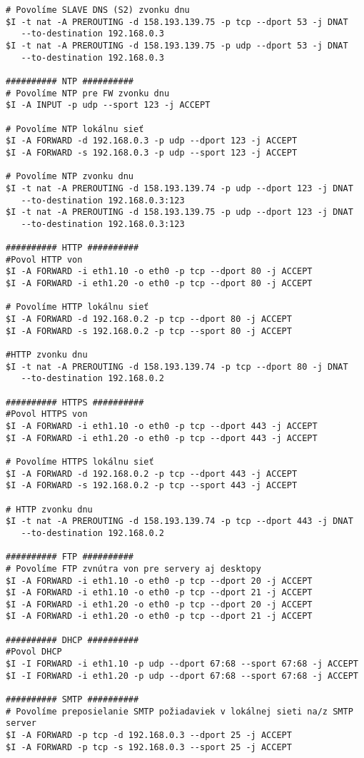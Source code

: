 {\begin{small}
\begin{verbatim}
# Povolíme SLAVE DNS (S2) zvonku dnu
$I -t nat -A PREROUTING -d 158.193.139.75 -p tcp --dport 53 -j DNAT
   --to-destination 192.168.0.3
$I -t nat -A PREROUTING -d 158.193.139.75 -p udp --dport 53 -j DNAT
   --to-destination 192.168.0.3

########## NTP ##########
# Povolíme NTP pre FW zvonku dnu
$I -A INPUT -p udp --sport 123 -j ACCEPT

# Povolíme NTP lokálnu sieť
$I -A FORWARD -d 192.168.0.3 -p udp --dport 123 -j ACCEPT
$I -A FORWARD -s 192.168.0.3 -p udp --sport 123 -j ACCEPT

# Povolíme NTP zvonku dnu
$I -t nat -A PREROUTING -d 158.193.139.74 -p udp --dport 123 -j DNAT
   --to-destination 192.168.0.3:123
$I -t nat -A PREROUTING -d 158.193.139.75 -p udp --dport 123 -j DNAT
   --to-destination 192.168.0.3:123

########## HTTP ##########
#Povol HTTP von
$I -A FORWARD -i eth1.10 -o eth0 -p tcp --dport 80 -j ACCEPT
$I -A FORWARD -i eth1.20 -o eth0 -p tcp --dport 80 -j ACCEPT

# Povolíme HTTP lokálnu sieť
$I -A FORWARD -d 192.168.0.2 -p tcp --dport 80 -j ACCEPT
$I -A FORWARD -s 192.168.0.2 -p tcp --sport 80 -j ACCEPT

#HTTP zvonku dnu
$I -t nat -A PREROUTING -d 158.193.139.74 -p tcp --dport 80 -j DNAT
   --to-destination 192.168.0.2

########## HTTPS ##########
#Povol HTTPS von
$I -A FORWARD -i eth1.10 -o eth0 -p tcp --dport 443 -j ACCEPT
$I -A FORWARD -i eth1.20 -o eth0 -p tcp --dport 443 -j ACCEPT

# Povolíme HTTPS lokálnu sieť
$I -A FORWARD -d 192.168.0.2 -p tcp --dport 443 -j ACCEPT
$I -A FORWARD -s 192.168.0.2 -p tcp --sport 443 -j ACCEPT

# HTTP zvonku dnu
$I -t nat -A PREROUTING -d 158.193.139.74 -p tcp --dport 443 -j DNAT
   --to-destination 192.168.0.2

########## FTP ##########
# Povolíme FTP zvnútra von pre servery aj desktopy
$I -A FORWARD -i eth1.10 -o eth0 -p tcp --dport 20 -j ACCEPT
$I -A FORWARD -i eth1.10 -o eth0 -p tcp --dport 21 -j ACCEPT
$I -A FORWARD -i eth1.20 -o eth0 -p tcp --dport 20 -j ACCEPT
$I -A FORWARD -i eth1.20 -o eth0 -p tcp --dport 21 -j ACCEPT

########## DHCP ##########
#Povol DHCP
$I -I FORWARD -i eth1.10 -p udp --dport 67:68 --sport 67:68 -j ACCEPT
$I -I FORWARD -i eth1.20 -p udp --dport 67:68 --sport 67:68 -j ACCEPT

########## SMTP ##########
# Povolíme preposielanie SMTP požiadaviek v lokálnej sieti na/z SMTP server
$I -A FORWARD -p tcp -d 192.168.0.3 --dport 25 -j ACCEPT
$I -A FORWARD -p tcp -s 192.168.0.3 --sport 25 -j ACCEPT


\end{verbatim}
\end{small}}
